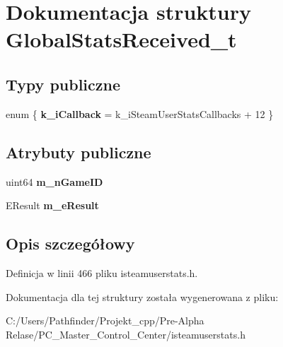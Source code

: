\hypertarget{struct_global_stats_received__t}{}\section{Dokumentacja struktury Global\+Stats\+Received\+\_\+t}
\label{struct_global_stats_received__t}
\subsection*{Typy publiczne}
\begin{DoxyCompactItemize}
\item 
\mbox{\label{struct_global_stats_received__t_a821f692c94f7ad4ab5e127af6ab59412}} 
enum \{ {\bfseries k\+\_\+i\+Callback} = k\+\_\+i\+Steam\+User\+Stats\+Callbacks + 12
 \}
\end{DoxyCompactItemize}
\subsection*{Atrybuty publiczne}
\begin{DoxyCompactItemize}
\item 
\mbox{\label{struct_global_stats_received__t_a7e4e8787380b85892dd0f4b92f93ee6d}} 
uint64 {\bfseries m\+\_\+n\+Game\+ID}
\item 
\mbox{\label{struct_global_stats_received__t_aefbfd3cd7b3f0fbbcf3074da02b37d3c}} 
E\+Result {\bfseries m\+\_\+e\+Result}
\end{DoxyCompactItemize}


\subsection{Opis szczegółowy}


Definicja w linii 466 pliku isteamuserstats.\+h.



Dokumentacja dla tej struktury została wygenerowana z pliku\+:\begin{DoxyCompactItemize}
\item 
C\+:/\+Users/\+Pathfinder/\+Projekt\+\_\+cpp/\+Pre-\/\+Alpha Relase/\+P\+C\+\_\+\+Master\+\_\+\+Control\+\_\+\+Center/isteamuserstats.\+h\end{DoxyCompactItemize}
